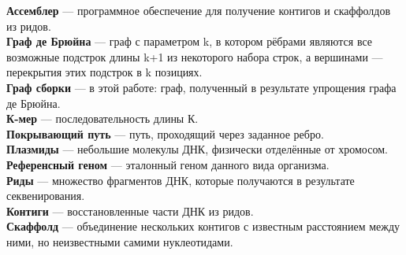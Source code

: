 \documentclass[14pt]{matmex-diploma-custom}
\begin{document}
\textbf{Ассемблер} --- программное обеспечение для получение контигов и скаффолдов из ридов.\\

\textbf{Граф де Брюйна} --- граф с параметром k, в котором рёбрами являются все возможные подстрок длины k+1 из некоторого набора строк, а вершинами --- перекрытия этих подстрок в k позициях.\\

\textbf{Граф сборки} --- в этой работе: граф, полученный в результате упрощения графа де Брюйна.\\

\textbf{К-мер} --- последовательность длины К.\\

\textbf{Покрывающий путь} --- путь, проходящий через заданное ребро.\\

\textbf{Плазмиды} --- небольшие молекулы ДНК, физически отделённые от хромосом.\\

\textbf{Референсный геном} --- эталонный геном данного вида организма.\\

\textbf{Риды} --- множество фрагментов ДНК, которые получаются в результате секвенирования.\\

\textbf{Контиги} --- восстановленные части ДНК из ридов.\\

\textbf{Скаффолд} --- объединение нескольких контигов с известным расстоянием между ними, но неизвестными самими нуклеотидами.\\


\setmonofont[Mapping=tex-text]{CMU Typewriter Text}

%

\end{document}
